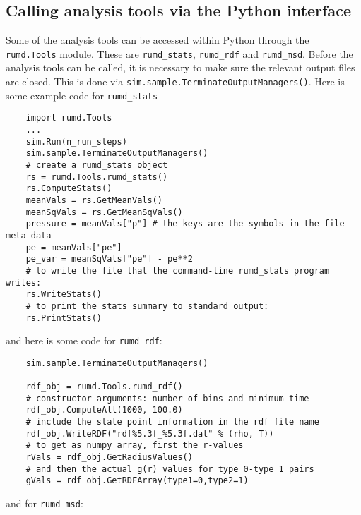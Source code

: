 \documentclass[a4paper]{article}
\begin{document}
\subsection{Calling analysis tools via the Python interface}
Some of the analysis tools can be accessed within Python through the
\verb|rumd.Tools| module. These are \verb|rumd_stats|, \verb|rumd_rdf| and
\verb|rumd_msd|. Before the analysis tools can be called, it is necessary to 
make sure the relevant output files are closed. This is done via 
\verb|sim.sample.TerminateOutputManagers()|. Here is some example code for
\verb|rumd_stats|


\begin{verbatim}
    import rumd.Tools
    ...
    sim.Run(n_run_steps)
    sim.sample.TerminateOutputManagers()
    # create a rumd_stats object
    rs = rumd.Tools.rumd_stats()
    rs.ComputeStats()
    meanVals = rs.GetMeanVals()
    meanSqVals = rs.GetMeanSqVals()
    pressure = meanVals["p"] # the keys are the symbols in the file meta-data
    pe = meanVals["pe"]
    pe_var = meanSqVals["pe"] - pe**2
    # to write the file that the command-line rumd_stats program writes:
    rs.WriteStats()
    # to print the stats summary to standard output:
    rs.PrintStats()
\end{verbatim}
and here is some code for \verb|rumd_rdf|:

\begin{verbatim}
    sim.sample.TerminateOutputManagers()

    rdf_obj = rumd.Tools.rumd_rdf()
    # constructor arguments: number of bins and minimum time
    rdf_obj.ComputeAll(1000, 100.0)
    # include the state point information in the rdf file name
    rdf_obj.WriteRDF("rdf%5.3f_%5.3f.dat" % (rho, T))
    # to get as numpy array, first the r-values
    rVals = rdf_obj.GetRadiusValues()
    # and then the actual g(r) values for type 0-type 1 pairs
    gVals = rdf_obj.GetRDFArray(type1=0,type2=1)
\end{verbatim}
and for \verb|rumd_msd|:
\end{document}
